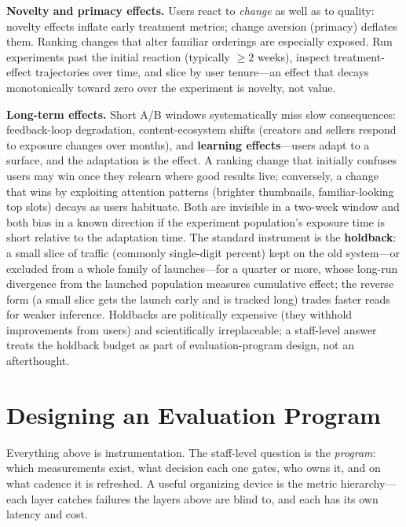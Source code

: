 \textbf{Novelty and primacy effects.} Users react to \textit{change} as well as to quality: novelty effects inflate early treatment metrics; change aversion (primacy) deflates them. Ranking changes that alter familiar orderings are especially exposed. Run experiments past the initial reaction (typically $\geq 2$ weeks), inspect treatment-effect trajectories over time, and slice by user tenure---an effect that decays monotonically toward zero over the experiment is novelty, not value.

\textbf{Long-term effects.} Short A/B windows systematically miss slow consequences: feedback-loop degradation, content-ecosystem shifts (creators and sellers respond to exposure changes over months), and \textbf{learning effects}---users adapt to a surface, and the adaptation is the effect. A ranking change that initially confuses users may win once they relearn where good results live; conversely, a change that wins by exploiting attention patterns (brighter thumbnails, familiar-looking top slots) decays as users habituate. Both are invisible in a two-week window and both bias in a known direction if the experiment population's exposure time is short relative to the adaptation time. The standard instrument is the \textbf{holdback}: a small slice of traffic (commonly single-digit percent) kept on the old system---or excluded from a whole family of launches---for a quarter or more, whose long-run divergence from the launched population measures cumulative effect; the reverse form (a small slice gets the launch early and is tracked long) trades faster reads for weaker inference. Holdbacks are politically expensive (they withhold improvements from users) and scientifically irreplaceable; a staff-level answer treats the holdback budget as part of evaluation-program design, not an afterthought.

\section{Designing an Evaluation Program}
\label{sr:sec:eval_program}

Everything above is instrumentation. The staff-level question is the \textit{program}: which measurements exist, what decision each one gates, who owns it, and on what cadence it is refreshed. A useful organizing device is the metric hierarchy---each layer catches failures the layers above are blind to, and each has its own latency and cost.

